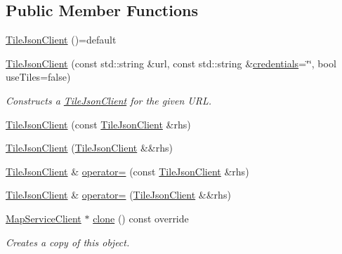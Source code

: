 \subsection*{Public Member Functions}
\begin{DoxyCompactItemize}
\item 
\hyperlink{classdg_1_1deepcore_1_1imagery_1_1_tile_json_client_a58fc035cc167eb66f4ff9d6ec6f923f2}{Tile\+Json\+Client} ()=default
\item 
\hyperlink{group___imagery_module_ga3a03a27c401542c408a982382e611056}{Tile\+Json\+Client} (const std\+::string \&url, const std\+::string \&\hyperlink{group___imagery_module_gac4c03ea635c336ca2fe7de533706c11c}{credentials}=\char`\"{}\char`\"{}, bool use\+Tiles=false)
\begin{DoxyCompactList}\small\item\em Constructs a \hyperlink{classdg_1_1deepcore_1_1imagery_1_1_tile_json_client}{Tile\+Json\+Client} for the given U\+RL. \end{DoxyCompactList}\item 
\hyperlink{classdg_1_1deepcore_1_1imagery_1_1_tile_json_client_a4d965e38be0d428927a9459ef41eeee6}{Tile\+Json\+Client} (const \hyperlink{classdg_1_1deepcore_1_1imagery_1_1_tile_json_client}{Tile\+Json\+Client} \&rhs)
\item 
\hyperlink{classdg_1_1deepcore_1_1imagery_1_1_tile_json_client_a8e85d1335a041986b23f212bd514c179}{Tile\+Json\+Client} (\hyperlink{classdg_1_1deepcore_1_1imagery_1_1_tile_json_client}{Tile\+Json\+Client} \&\&rhs)
\item 
\hyperlink{classdg_1_1deepcore_1_1imagery_1_1_tile_json_client}{Tile\+Json\+Client} \& \hyperlink{classdg_1_1deepcore_1_1imagery_1_1_tile_json_client_ae937bead57a71b88b12b6a03e91142c0}{operator=} (const \hyperlink{classdg_1_1deepcore_1_1imagery_1_1_tile_json_client}{Tile\+Json\+Client} \&rhs)
\item 
\hyperlink{classdg_1_1deepcore_1_1imagery_1_1_tile_json_client}{Tile\+Json\+Client} \& \hyperlink{classdg_1_1deepcore_1_1imagery_1_1_tile_json_client_ab4aa58d0595bbd11aad78adb52fefd55}{operator=} (\hyperlink{classdg_1_1deepcore_1_1imagery_1_1_tile_json_client}{Tile\+Json\+Client} \&\&rhs)
\item 
\hyperlink{classdg_1_1deepcore_1_1imagery_1_1_map_service_client}{Map\+Service\+Client} $\ast$ \hyperlink{classdg_1_1deepcore_1_1imagery_1_1_tile_json_client_a0b16a50a0b8912c9e94842b97e64bd42}{clone} () const override
\begin{DoxyCompactList}\small\item\em Creates a copy of this object. \end{DoxyCompactList}\item 

\end{DoxyCompactItemize}
